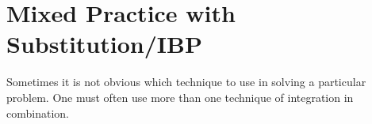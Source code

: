 \begin{comment}
\subsection{Spot the Error!}
\todo[inline]{I think I'm actually going to put alllll of the STE's at the very end of the section as one big mixed region.}
\todo[inline]{I kind of like that idea. Sort of a review section of mixed practice. Don't tell them what method to use, have spot the errors... Be a good place for old midterm/final problems that you never want to use again.}
In each of the following attempted solutions, there is an error.  Circle where the error occurs and write a short sentence that describes what went wrong.  \begin{enumerate}
\item Find the antiderivative: $ \int \frac{x}{x^2+1} \dif x $
\begin{center}
\texttt{[image: ChapterAntidiff/STEusub.png]}
\end{center}

\item Find the antiderivative: $\int x^2\cos(2x) \dif x$
\end{enumerate}

\end{comment}
\section{Mixed Practice with Substitution/IBP}

Sometimes it is not obvious which technique to use in solving a particular problem.  One must often use more than one technique of integration in combination. 

